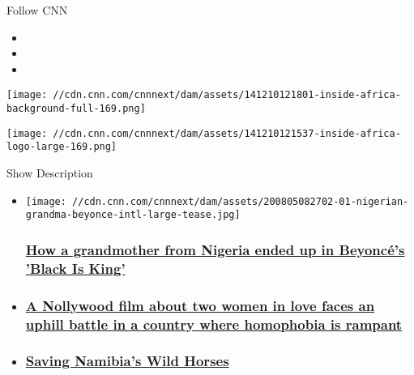 Follow CNN

\begin{itemize}
\item
\item
\item
\end{itemize}

\texttt{[image: //cdn.cnn.com/cnnnext/dam/assets/141210121801-inside-africa-background-full-169.png]}

\texttt{[image: //cdn.cnn.com/cnnnext/dam/assets/141210121537-inside-africa-logo-large-169.png]}

Show Description

\href{//facebook.com/CNNAfrica}{}

\href{//twitter.com/CNNAfrica}{}

\href{//www.instagram.com/CNNAfrica}{}

\begin{itemize}
\item
  \href{/2020/08/05/africa/nigerian-grandma-beyonce-intl/index.html}{}

  \texttt{[image: //cdn.cnn.com/cnnnext/dam/assets/200805082702-01-nigerian-grandma-beyonce-intl-large-tease.jpg]}

  \hypertarget{how-a-grandmother-from-nigeria-ended-up-in-beyoncuxe9s-black-is-king}{%
  \subsubsection{\texorpdfstring{\href{/2020/08/05/africa/nigerian-grandma-beyonce-intl/index.html}{How
  a grandmother from Nigeria ended up in Beyoncé's 'Black Is
  King'}}{How a grandmother from Nigeria ended up in Beyoncé's 'Black Is King'}}\label{how-a-grandmother-from-nigeria-ended-up-in-beyoncuxe9s-black-is-king}}
\item
  \hypertarget{a-nollywood-film-about-two-women-in-love-faces-an-uphill-battle-in-a-country-where-homophobia-is-rampant}{%
  \subsubsection{\texorpdfstring{\href{/style/article/ife-queer-film-nigeria-intl/index.html}{A
  Nollywood film about two women in love faces an uphill battle in a
  country where homophobia is
  rampant}}{A Nollywood film about two women in love faces an uphill battle in a country where homophobia is rampant}}\label{a-nollywood-film-about-two-women-in-love-faces-an-uphill-battle-in-a-country-where-homophobia-is-rampant}}
\item
  \hypertarget{saving-namibias-wild-horses}{%
  \subsubsection{\texorpdfstring{\href{/videos/world/2020/07/28/namibia-wild-horses-namib-desert-pandemic-coronavirus-spc.cnn}{Saving
  Namibia's Wild
  Horses}}{Saving Namibia's Wild Horses}}\label{saving-namibias-wild-horses}}
\end{itemize}

